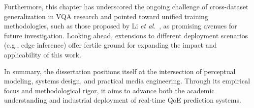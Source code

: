 Furthermore, this chapter has underscored the ongoing challenge of cross-dataset generalization in VQA research and pointed toward unified training methodologies, such as those proposed by Li \textit{et al.}~\cite{li2023unified}, as promising avenues for future investigation. Looking ahead, extensions to different deployment scenarios (e.g., edge inference) offer fertile ground for expanding the impact and applicability of this work.

In summary, the dissertation positions itself at the intersection of perceptual modeling, systems design, and practical media engineering. Through its empirical focus and methodological rigor, it aims to advance both the academic understanding and industrial deployment of real-time QoE prediction systems.
